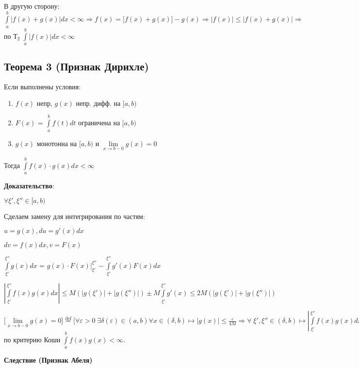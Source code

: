 \documentclass[a4paper,12pt]{article} %
\begin{document}
В другую сторону: $\int\limits_a^b |f(x) +g(x)| dx < \infty \Rightarrow f(x) = \bigl[f(x) + g(x) \bigr]-g(x) \Rightarrow |f(x)| \leq |f(x) + g(x)| \Rightarrow $ по $Т_2\; \int\limits_a^b |f(x)| dx < \infty$ 


\subsection*{Теорема 3 (Признак Дирихле)}

Если выполнены условия:

\begin{enumerate}
    \item $f(x)$ непр, $g(x)$ непр. дифф. на $[a, b)$
    
    \item $F(x)$ = $\int\limits_a^b f(t) dt$ ограничена на $[a, b)$
    
    \item $g(x)$ монотонна на $[a, b)$ и $\lim\limits_{x\rightarrow b-0}g(x) = 0$

\end{enumerate}

Тогда $\int\limits_a^b f(x)\cdot g(x) dx < \infty$

\textbf{Доказательство}:

$\forall \xi', \xi'' \in [a,b)$

Сделаем замену для интегрирования по частям: 

$u = g(x), du=g'(x)dx$

$dv=f(x)dx, v=F(x)$

$\int\limits_{\xi'}^{\xi''} g(x) dx$ = $g(x)\cdot F(x)\bigg|_{\xi'}^{\xi''} - \int\limits_{\xi'}^{\xi''} g'(x)F(x)dx$ 

$|\int\limits_{\xi'}^{\xi''} f(x)g(x)dx|\leq M(|g(\xi')|+|g(\xi'')|) \pm M \int\limits_{\xi'}^{\xi''} g'(x) \leq 2M(|g(\xi')|+|g(\xi'')|)$

$\bigl[ \lim\limits_{x\rightarrow b-0}g(x) = 0 \bigr] \stackrel{\text{def}}{=} \bigl[ \forall \varepsilon > 0 \; \exists \delta(\varepsilon) \in (a, b) \forall x\in (\delta, b) \longmapsto |g(x)| \leq \frac{\varepsilon}{4M} \Rightarrow \forall \; \xi', \xi'' \in (\delta, b) \longmapsto |\int\limits_{\xi'}^{\xi''} f(x)g(x)dx|<2M(\frac{\varepsilon}{4M}+\frac{\varepsilon}{4M}) = \varepsilon \Rightarrow $ по критерию Коши $\int\limits_{a}^{b}f(x)g(x)<\infty$.

\vspace{20}

\textbf{Следствие (Признак Абеля)}
\end{document}
